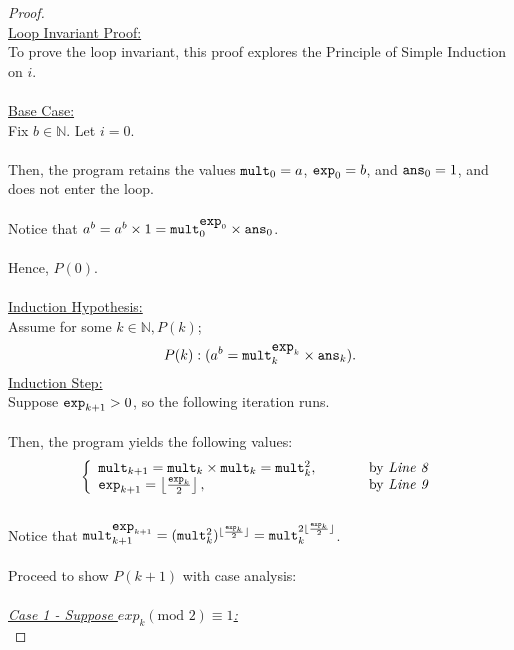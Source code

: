 \documentclass[12pt]{article}
\begin{document}
\begin{proof}
\leavevmode\\
    \underline{Loop Invariant Proof:} \\
    To prove the loop invariant, this proof explores the Principle of Simple Induction on $i$. \\
    \\
    \underline{Base Case:} \\
    Fix $b \in \mathbb{N}$. Let $i = 0$. \\
    \\
    Then, the program retains the values $\verb|mult|_0 = a$, $\verb|exp|_0 = b$, and $\verb|ans|_0 = 1$, and does not enter the loop. \\
    \\
    Notice that $a^b = a^b \times 1 = \verb|mult|_0^{\verb|exp|_0} \times \verb|ans|_0$. \\
    \\
    Hence, $P(0)$. \\
    \\
    \underline{Induction Hypothesis:} \\
    Assume for some $k \in \mathbb{N}, P(k)$;
    \[
        P(k): (a^b = \verb|mult|_k^{\verb|exp|_k} \times \verb|ans|_k) \text{.}
    \]
    \underline{Induction Step:} \\
    Suppose $\verb|exp|_{k + 1} > 0$, so the following iteration runs. \\
    \\
    Then, the program yields the following values:
    \[
    \left\{
    \begin{array}{ll}
    \verb|mult|_{k + 1} = \verb|mult|_k \times \verb|mult|_k = \verb|mult|_k^2, & \hspace{1cm} \text{by \textit{Line 8}} \\
    \verb|exp|_{k + 1} = \left\lfloor \frac{\texttt{exp}_k}{2} \right\rfloor, & \hspace{1cm} \text{by \textit{Line 9}}
    \end{array}
    \right.
    \]
    \\
    Notice that \(\verb|mult|_{k + 1}^{\verb|exp|_{k + 1}} = (\verb|mult|_k^2)^{\lfloor \frac{\texttt{exp}_k}{2} \rfloor} = \verb|mult|_k^{2 \lfloor \frac{\texttt{exp}_k}{2} \rfloor}\). \\
    \\
    Proceed to show $P(k + 1)$ with case analysis: \\
    \\
    \underline{\textit{Case 1 - Suppose \(exp_k (\text{mod } 2) \equiv 1\):}} \\

\end{proof}
\end{document}
